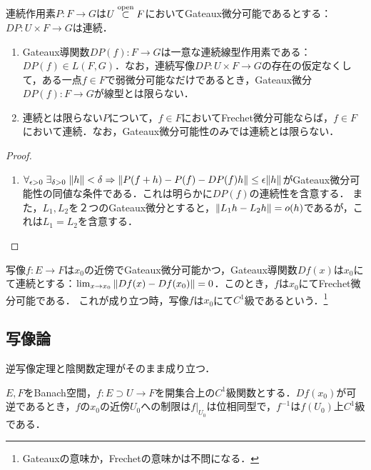 \documentclass[uplatex,dvipdfmx]{jsreport}
\begin{document}
\begin{lemma}
    連続作用素$P:F\to G$は$U\overset{\mathrm{open}}{\subset} F$においてGateaux微分可能であるとする：$DP:U\times F\to G$は連続．
    \begin{enumerate}
        \item Gateaux導関数$DP(f):F\to G$は一意な連続線型作用素である：$DP(f)\in L(F,G)$．なお，連続写像$DP:U\times F\to G$の存在の仮定なくして，ある一点$f\in F$で弱微分可能なだけであるとき，Gateaux微分$DP(f):F\to G$が線型とは限らない．
        \item 連続とは限らない$P$について，$f\in F$においてFrechet微分可能ならば，$f\in F$において連続．なお，Gateaux微分可能性のみでは連続とは限らない．
    \end{enumerate}
\end{lemma}
\begin{proof}\mbox{}
    \begin{enumerate}
        \item 
        $\forall_{\epsilon>0}\;\exists_{\delta>0}\;\|h\|<\delta\Rightarrow\|P(f+h)-P(f)-DP(f)h\|\le\epsilon\|h\|$がGateaux微分可能性の同値な条件である．これは明らかに$DP(f)$の連続性を含意する．
        また，$L_1,L_2$を２つのGateaux微分とすると，$\|L_1h-L_2h\|=o(h)$であるが，これは$L_1=L_2$を含意する．
    \end{enumerate}
\end{proof}

\begin{theorem}[$C^1$級]
    写像$f:E\to F$は$x_0$の近傍でGateaux微分可能かつ，Gateaux導関数$Df(x)$は$x_0$にて連続とする：$\lim_{x\to x_0}\|Df(x)-Df(x_0)\|=0$．このとき，$f$は$x_0$にてFrechet微分可能である．
    これが成り立つ時，写像$f$は$x_0$にて$C^1$級であるという．\footnote{Gateauxの意味か，Frechetの意味かは不問になる．}
\end{theorem}

\subsection{写像論}

\begin{tcolorbox}[colframe=ForestGreen, colback=ForestGreen!10!white,breakable,colbacktitle=ForestGreen!40!white,coltitle=black,fonttitle=\bfseries\sffamily,
title=]
    逆写像定理と陰関数定理がそのまま成り立つ．
\end{tcolorbox}

\begin{theorem}
    $E,F$をBanach空間，$f:E\supset U\to F$を開集合上の$C^1$級関数とする．$Df(x_0)$が可逆であるとき，$f$の$x_0$の近傍$U_0$への制限は$f|_{U_0}$は位相同型で，$f^{-1}$は$f(U_0)$上$C^1$級である．
\end{theorem}
\end{document}
